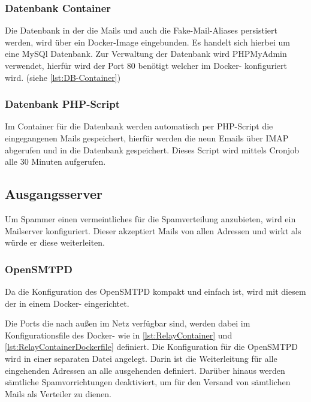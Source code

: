 \documentclass[a4paper,11pt,singlespacing]{article}
\begin{document}
		\subsubsection{Datenbank Container}\label{DB-Container}
			Die Datenbank in der die Mails und auch die Fake-Mail-Aliases persistiert werden, wird über ein Docker-Image eingebunden. Es handelt sich hierbei um eine MySQl Datenbank. Zur Verwaltung der Datenbank wird PHPMyAdmin verwendet, hierfür wird der Port 80 benötigt welcher im Docker- konfiguriert wird. (siehe \autoref{lst:DB-Container})

		\subsubsection{Datenbank PHP-Script}\label{DB-Hook-Container}
			Im Container für die Datenbank werden automatisch per PHP-Script die eingegangenen Mails gespeichert, hierfür werden die neun Emails über IMAP abgerufen und in die Datenbank gespeichert.
			Dieses Script wird mittels Cronjob alle 30 Minuten aufgerufen.

	\subsection{Ausgangsserver}\label{sec:UmsetzungOpenRelay}
		Um Spammer einen vermeintliches  für die Spamverteilung anzubieten, wird ein Mailserver konfiguriert. Dieser akzeptiert Mails von allen Adressen und wirkt als würde er diese weiterleiten.
		
		\subsubsection{OpenSMTPD}\label{OpenRelayOpenSMTPD}
			Da die Konfiguration des \textsf{OpenSMTPD} kompakt und einfach ist, wird mit diesem der  in einem Docker- eingerichtet.
			
			Die Ports die nach au{\ss}en im Netz verfügbar sind, werden dabei im Konfigurationsfile des Docker- wie in \autoref{lst:RelayContainer} und \autoref{lst:RelayContainerDockerfile} definiert. Die Konfiguration für die \textsf{OpenSMTPD} wird in einer separaten
Datei angelegt.
			Darin ist die Weiterleitung für alle eingehenden Adressen an alle ausgehenden definiert. Darüber hinaus werden sämtliche Spamvorrichtungen deaktiviert, um für den Versand von sämtlichen Mails als Verteiler zu dienen.
			
\end{document}
